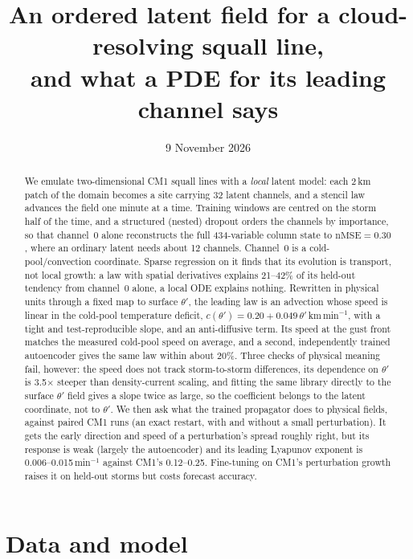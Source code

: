 \documentclass[11pt]{article}
\title{An ordered latent field for a cloud-resolving squall line,\\and what a PDE for its leading channel says}
\author{}
\date{9 November 2026}
\newcommand{\nmse}{\mathrm{nMSE}}
\begin{document}
\maketitle

\begin{abstract}
We emulate two-dimensional CM1 squall lines with a \emph{local} latent model: each 2\,km patch of the domain becomes a site carrying 32 latent channels, and a stencil law advances the field one minute at a time. Training windows are centred on the storm half of the time, and a structured (nested) dropout orders the channels by importance, so that channel~0 alone reconstructs the full 434-variable column state to $\nmse = 0.30$, where an ordinary latent needs about 12 channels. Channel~0 is a cold-pool/convection coordinate. Sparse regression on it finds that its evolution is transport, not local growth: a law with spatial derivatives explains 21--42\% of its held-out tendency from channel~0 alone, a local ODE explains nothing. Rewritten in physical units through a fixed map to surface $\theta'$, the leading law is an advection whose speed is linear in the cold-pool temperature deficit, $c(\theta') = 0.20 + 0.049\,\theta'$\,km\,min$^{-1}$, with a tight and test-reproducible slope, and an anti-diffusive term. Its speed at the gust front matches the measured cold-pool speed on average, and a second, independently trained autoencoder gives the same law within about 20\%. Three checks of physical meaning fail, however: the speed does not track storm-to-storm differences, its dependence on $\theta'$ is 3.5$\times$ steeper than density-current scaling, and fitting the same library directly to the surface $\theta'$ field gives a slope twice as large, so the coefficient belongs to the latent coordinate, not to $\theta'$. We then ask what the trained propagator does to physical fields, against paired CM1 runs (an exact restart, with and without a small perturbation). It gets the early direction and speed of a perturbation's spread roughly right, but its response is weak (largely the autoencoder) and its leading Lyapunov exponent is 0.006--0.015\,min$^{-1}$ against CM1's 0.12--0.25. Fine-tuning on CM1's perturbation growth raises it on held-out storms but costs forecast accuracy.
\end{abstract}

\section{Data and model}\label{sec:model}
\end{document}
